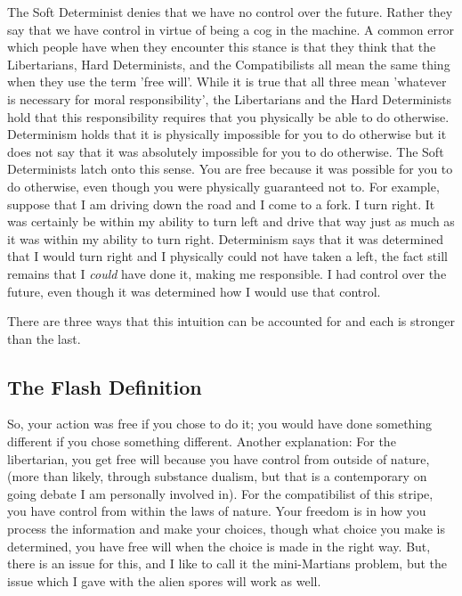 The Soft Determinist denies that we have no control over the future. Rather they say that we have control in virtue of being a cog in the machine. A common error which people have when they encounter this stance is that they think that the Libertarians, Hard Determinists, and the Compatibilists all mean the same thing when they use the term 'free will'. While it is true that all three mean 'whatever is necessary for moral responsibility', the Libertarians and the Hard Determinists hold that this responsibility requires that you physically be able to do otherwise. Determinism holds that it is physically impossible for you to do otherwise but it does not say that it was absolutely impossible for you to do otherwise. The Soft Determinists latch onto this sense. You are free because it was possible for you to do otherwise, even though you were physically guaranteed not to. For example, suppose that I am driving down the road and I come to a fork. I turn right. It was certainly be within my ability to turn left and drive that way just as much as it was within my ability to turn right. Determinism says that it was determined that I would turn right and I physically could not have taken a left, the fact still remains that I \emph{could} have done it, making me responsible. I had control over the future, even though it was determined how I would use that control.

There are three ways that this intuition can be accounted for and each is stronger than the last. 

\subsection{The Flash Definition}


So, your action was free if you chose to do it; you would have done something different if you chose something different. Another explanation: For the libertarian, you get free will because you have control from outside of nature,  (more than likely, through substance dualism, but that is a contemporary on going debate I am personally involved in). For the compatibilist of this stripe, you have control from within the laws of nature. Your freedom is in how you process the information and make your choices, though what choice you make is determined, you have free will when the choice is made in the right way. But, there is an issue for this, and I like to call it the mini-Martians problem, but the issue which I gave with the alien spores will work as well. 

